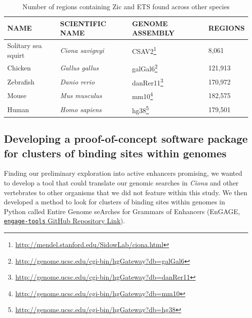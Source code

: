 \begin{small}
    \begin{table}[ht]
        \centering
        \caption{Number of regions containing Zic and ETS found across other species} 
        \begin{tabular}{|l|l|l|l|}
            \hline
            \textbf{NAME} & \textbf{SCIENTIFIC NAME} & \textbf{GENOME ASSEMBLY} & \textbf{REGIONS} \\ \hline 
            

            Solitary sea squirt & \textit{Ciona savignyi} & CSAV2\footnote{\href{http://mendel.stanford.edu/SidowLab/ciona.html}{http://mendel.stanford.edu/SidowLab/ciona.html}} \cite{hill2008} & 8,061\\
            Chicken & \textit{Gallus gallus} & galGal6\footnote{\href{http://genome.ucsc.edu/cgi-bin/hgGateway?db=galGal6}{http://genome.ucsc.edu/cgi-bin/hgGateway?db=galGal6}} & 121,913\\
            Zebrafish & \textit{Danio rerio} & danRer11\footnote{\href{http://genome.ucsc.edu/cgi-bin/hgGateway?db=danRer11}{http://genome.ucsc.edu/cgi-bin/hgGateway?db=danRer11}} & 170,972\\
            Mouse & \textit{Mus musculus} & mm10\footnote{\href{http://genome.ucsc.edu/cgi-bin/hgGateway?db=mm10}{http://genome.ucsc.edu/cgi-bin/hgGateway?db=mm10}} & 182,575\\
            Human & \textit{Homo sapiens} & hg38\footnote{\href{http://genome.ucsc.edu/cgi-bin/hgGateway?db=hg38}{http://genome.ucsc.edu/cgi-bin/hgGateway?db=hg38}} & 179,501\\
            \hline
        \end{tabular}
        \label{tab:genome search vertebrate numbers}
    \end{table}
\end{small}

\subsection{Developing a proof-of-concept software package for clusters of binding sites within genomes}

Finding our preliminary exploration into active enhancers promising, we wanted to develop a tool that could translate our genomic searches in \textit{Ciona} and other vertebrates to other organisms that we did not feature within this study. We then developed a method to look for clusters of binding sites within genomes in Python called Entire Genome seArches for Grammars of Enhancers (EnGAGE, \href{https://github.com/farleylab/engage-tools}{\texttt{engage-tools} GitHub Repository Link}). 

